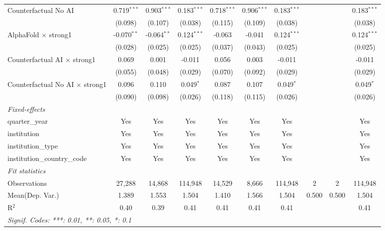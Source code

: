 \begin{tabular}{lccccccccc}
   Counterfactual No AI                   & 0.719$^{***}$ & 0.903$^{***}$ & 0.183$^{***}$ & 0.718$^{***}$ & 0.906$^{***}$ & 0.183$^{***}$ &     &     & 0.183$^{***}$\\   
                                          & (0.098)       & (0.107)       & (0.038)       & (0.115)       & (0.109)       & (0.038)       &     &     & (0.038)\\   
   AlphaFold $\times$ strong1             & -0.070$^{**}$ & -0.064$^{**}$ & 0.124$^{***}$ & -0.063        & -0.041        & 0.124$^{***}$ &     &     & 0.124$^{***}$\\   
                                          & (0.028)       & (0.025)       & (0.025)       & (0.037)       & (0.043)       & (0.025)       &     &     & (0.025)\\   
   Counterfactual AI $\times$ strong1     & 0.069         & 0.001         & -0.011        & 0.056         & 0.003         & -0.011        &     &     & -0.011\\   
                                          & (0.055)       & (0.048)       & (0.029)       & (0.070)       & (0.092)       & (0.029)       &     &     & (0.029)\\   
   Counterfactual No AI $\times$ strong1  & 0.096         & 0.110         & 0.049$^{*}$   & 0.087         & 0.107         & 0.049$^{*}$   &     &     & 0.049$^{*}$\\   
                                          & (0.090)       & (0.098)       & (0.026)       & (0.118)       & (0.115)       & (0.026)       &     &     & (0.026)\\   
   \midrule
   \emph{Fixed-effects}\\
   quarter\_year                          & Yes           & Yes           & Yes           & Yes           & Yes           & Yes           &     &     & Yes\\  
   institution                            & Yes           & Yes           & Yes           & Yes           & Yes           & Yes           &     &     & Yes\\  
   institution\_type                      & Yes           & Yes           & Yes           & Yes           & Yes           & Yes           &     &     & Yes\\  
   institution\_country\_code             & Yes           & Yes           & Yes           & Yes           & Yes           & Yes           &     &     & Yes\\  
   \midrule
   \emph{Fit statistics}\\
   Observations                           & 27,288        & 14,868        & 114,948       & 14,529        & 8,666         & 114,948       & 2   & 2   & 114,948\\  
Mean(Dep. Var.) & 1.389 & 1.553 & 1.504 & 1.410 & 1.566 & 1.504 & 0.500 & 0.500 & 1.504 \\
   R$^2$                                  & 0.40          & 0.39          & 0.41          & 0.41          & 0.41          & 0.41          &     &     & 0.41\\  
   \midrule \midrule
   \multicolumn{10}{l}{\emph{Signif. Codes: ***: 0.01, **: 0.05, *: 0.1}}\\
\end{tabular}
\par\endgroup
